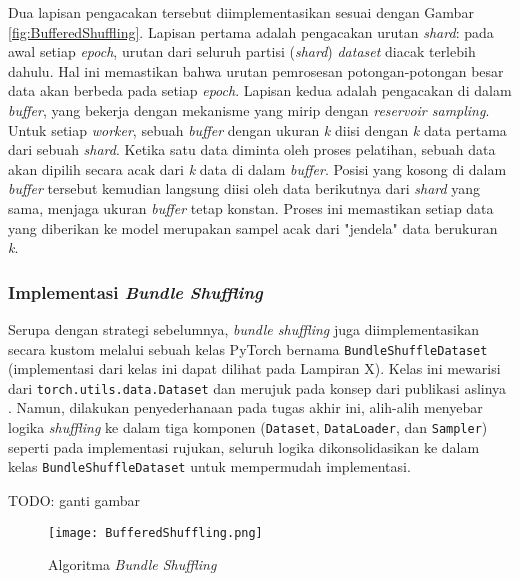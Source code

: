 Dua lapisan pengacakan tersebut diimplementasikan sesuai dengan Gambar \ref{fig:BufferedShuffling}. Lapisan pertama adalah pengacakan urutan \textit{shard}: pada awal setiap \textit{epoch}, urutan dari seluruh partisi (\textit{shard}) \textit{dataset} diacak terlebih dahulu. Hal ini memastikan bahwa urutan pemrosesan potongan-potongan besar data akan berbeda pada setiap \textit{epoch}. Lapisan kedua adalah pengacakan di dalam \textit{buffer}, yang bekerja dengan mekanisme yang mirip dengan \textit{reservoir sampling}. Untuk setiap \textit{worker}, sebuah \textit{buffer} dengan ukuran \textit{k} diisi dengan \textit{k} data pertama dari sebuah \textit{shard}. Ketika satu data diminta oleh proses pelatihan, sebuah data akan dipilih secara acak dari \textit{k} data di dalam \textit{buffer}. Posisi yang kosong di dalam \textit{buffer} tersebut kemudian langsung diisi oleh data berikutnya dari \textit{shard} yang sama, menjaga ukuran \textit{buffer} tetap konstan. Proses ini memastikan setiap data yang diberikan ke model merupakan sampel acak dari "jendela" data berukuran \textit{k}.

\subsubsection{Implementasi \textit{Bundle Shuffling}}
Serupa dengan strategi sebelumnya, \textit{bundle shuffling} juga diimplementasikan secara kustom melalui sebuah kelas PyTorch bernama \texttt{BundleShuffleDataset} (implementasi dari kelas ini dapat dilihat pada Lampiran X). Kelas ini mewarisi dari \texttt{torch.utils.data.Dataset} dan merujuk pada konsep dari publikasi aslinya \parencite{BundleShuffle}. Namun, dilakukan penyederhanaan pada tugas akhir ini, alih-alih menyebar logika \textit{shuffling} ke dalam tiga komponen (\texttt{Dataset}, \texttt{DataLoader}, dan \texttt{Sampler}) seperti pada implementasi rujukan, seluruh logika dikonsolidasikan ke dalam kelas \texttt{BundleShuffleDataset} untuk mempermudah implementasi.

TODO: ganti gambar
\begin{figure}[t]
    \centering
    \texttt{[image: BufferedShuffling.png]}
    \caption{Algoritma \textit{Bundle Shuffling}}
    \label{fig:BundleShuffling}
\end{figure}

